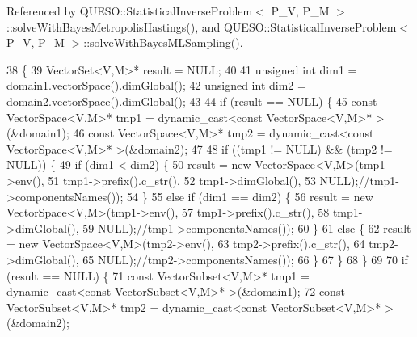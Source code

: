 Referenced by Q\-U\-E\-S\-O\-::\-Statistical\-Inverse\-Problem$<$ P\-\_\-\-V, P\-\_\-\-M $>$\-::solve\-With\-Bayes\-Metropolis\-Hastings(), and Q\-U\-E\-S\-O\-::\-Statistical\-Inverse\-Problem$<$ P\-\_\-\-V, P\-\_\-\-M $>$\-::solve\-With\-Bayes\-M\-L\-Sampling().


\begin{DoxyCode}
38 \{
39   VectorSet<V,M>* result = NULL;
40 
41   \textcolor{keywordtype}{unsigned} \textcolor{keywordtype}{int} dim1 = domain1.vectorSpace().dimGlobal();
42   \textcolor{keywordtype}{unsigned} \textcolor{keywordtype}{int} dim2 = domain2.vectorSpace().dimGlobal();
43 
44   \textcolor{keywordflow}{if} (result == NULL) \{
45     \textcolor{keyword}{const} VectorSpace<V,M>* tmp1 = \textcolor{keyword}{dynamic\_cast<}\textcolor{keyword}{const }VectorSpace<V,M>* \textcolor{keyword}{>}(&domain1);
46     \textcolor{keyword}{const} VectorSpace<V,M>* tmp2 = \textcolor{keyword}{dynamic\_cast<}\textcolor{keyword}{const }VectorSpace<V,M>* \textcolor{keyword}{>}(&domain2);
47 
48     \textcolor{keywordflow}{if} ((tmp1 != NULL) && (tmp2 != NULL)) \{
49       \textcolor{keywordflow}{if} (dim1 < dim2) \{
50         result = \textcolor{keyword}{new} VectorSpace<V,M>(tmp1->env(),
51                                              tmp1->prefix().c\_str(),
52                                              tmp1->dimGlobal(),
53                                              NULL);\textcolor{comment}{//tmp1->componentsNames());}
54       \}
55       \textcolor{keywordflow}{else} \textcolor{keywordflow}{if} (dim1 == dim2) \{
56         result = \textcolor{keyword}{new} VectorSpace<V,M>(tmp1->env(),
57                                              tmp1->prefix().c\_str(),
58                                              tmp1->dimGlobal(),
59                                              NULL);\textcolor{comment}{//tmp1->componentsNames());}
60       \}
61       \textcolor{keywordflow}{else} \{
62         result = \textcolor{keyword}{new} VectorSpace<V,M>(tmp2->env(),
63                                              tmp2->prefix().c\_str(),
64                                              tmp2->dimGlobal(),
65                                              NULL);\textcolor{comment}{//tmp2->componentsNames());}
66       \}
67     \}
68   \}
69 
70   \textcolor{keywordflow}{if} (result == NULL) \{
71     \textcolor{keyword}{const} VectorSubset<V,M>* tmp1 = \textcolor{keyword}{dynamic\_cast<}\textcolor{keyword}{const }VectorSubset<V,M>* \textcolor{keyword}{>}(&domain1);
72     \textcolor{keyword}{const} VectorSubset<V,M>* tmp2 = \textcolor{keyword}{dynamic\_cast<}\textcolor{keyword}{const }VectorSubset<V,M>* \textcolor{keyword}{>}(&domain2);

\end{DoxyCode}
